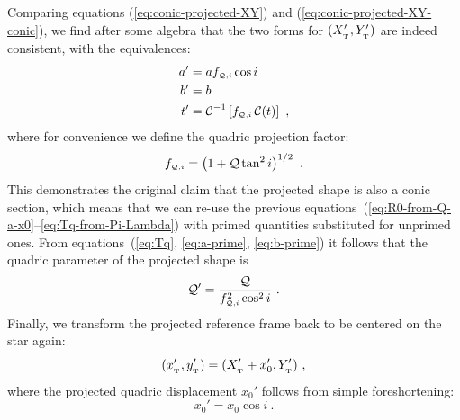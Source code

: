 Comparing equations (\ref{eq:conic-projected-XY}) and
(\ref{eq:conic-projected-XY-conic}), we find after some algebra that
the two forms for \((X_{_{\mathrm{\scriptscriptstyle T}}}', Y_{_{\mathrm{\scriptscriptstyle T}}}')\) are indeed consistent, with
the equivalences:
%
\newcommand\fQi{\ensuremath{f_{\scriptscriptstyle \Q,i}}}
\begin{align}
  \label{eq:a-prime}
  a' &= a \fQi \cos i  \\
  \label{eq:b-prime}
  b' &= b \\
  t' &= \Cos^{-1} \left[ \fQi \Cos(t) \right]  \ ,
\end{align}
where for convenience we define the quadric projection factor:
\begin{equation}
  \label{eq:fQi-factor}
  \fQi = \left( 1 + \Q \tan^2 i \right)^{1/2} \ .
\end{equation}
This demonstrates the original claim that the projected shape is also
a conic section, which means that we can re-use the previous
equations~(\ref{eq:R0-from-Q-a-x0}--\ref{eq:Tq-from-Pi-Lambda}) with
primed quantities substituted for unprimed ones.  From
equations~(\ref{eq:Tq}, \ref{eq:a-prime}, \ref{eq:b-prime}) it follows
that the quadric parameter of the projected shape is
\begin{equation}
  \label{eq:Q-prime}
  \Q' = \frac{ \Q } { \fQi^2 \cos^2 i} \ .
\end{equation}
Finally, we transform the projected reference frame back to be
centered on the star again:
\begin{equation}
  \label{eq:XYZ-xyz-prime}
  (x_{_{\mathrm{\scriptscriptstyle T}}}', y_{_{\mathrm{\scriptscriptstyle T}}}') = (X_{_{\mathrm{\scriptscriptstyle T}}}' + x_0', Y_{_{\mathrm{\scriptscriptstyle T}}}') \ , 
\end{equation}
where the projected quadric displacement \(x_0'\) follows from simple
foreshortening:
\begin{equation}
  \label{eq:x0-prime}
  x_0' = x_0 \cos i \ .
\end{equation}


